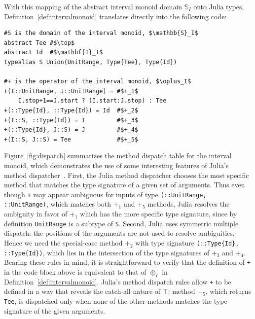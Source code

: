 \documentclass{sig-alternate}
\newcommand{\code}[1]{\texttt{#1}}
\begin{document}
With this mapping of the abstract interval monoid domain $\mathbb S_I$ onto
Julia types, Definition~\ref{def:intervalmonoid} translates directly into the
following code:

\begin{verbatim}
#S is the domain of the interval monoid, $\mathbb{S}_I$
abstract Tee #$\top$
abstract Id  #$\mathbf{1}_I$
typealias S Union(UnitRange, Type{Tee}, Type{Id})

#+ is the operator of the interval monoid, $\oplus_I$
+(I::UnitRange, J::UnitRange) = #$+_1$ 
    I.stop+1==J.start ? (I.start:J.stop) : Tee
+(::Type{Id}, ::Type{Id}) = Id  #$+_2$
+(I::S, ::Type{Id}) = I         #$+_3$
+(::Type{Id}, J::S) = J         #$+_4$
+(I::S, J::S) = Tee             #$+_5$
\end{verbatim}

Figure~\ref{fig:dispatch} summarizes the method dispatch table for the interval
monoid, which demonstrates the use of some interesting features of Julia's
method dispatcher~\cite{Bezanson2012}. First, the Julia method dispatcher
chooses the most specific method that matches the type signature of a given set
of arguments. Thus even though \code{+} may appear ambiguous for inputs of 
type \code{(::Unit\-Range, ::UnitRange)}, which matches both $+_1$ and $+_5$
methods, Julia resolves the ambiguity in favor of $+_1$ which has the more
specific type signature, since by definition \code{UnitRange} is a subtype of
\code{S}. Second, Julia uses symmetric multiple dispatch: the positions of the
arguments are not used to resolve ambiguities. Hence we need the special-case
method $+_2$ with type signature \code{(::Type\{Id\}, ::Type\{Id\})}, which
lies in the intersection of the type signatures of $+_3$ and $+_4$.  Bearing
these rules in mind, it is straightforward to verify that the definition of
\code{+} in the code block above is equivalent to that of $\oplus_I$ in
Definition~\ref{def:intervalmonoid}. Julia's method dispatch rules allow
\code{+} to be defined in a way that reveals the catch-all nature of $\top$:
method $+_5$, which returns \code{Tee}, is dispatched only when none of the
other methods matches the type signature of the given arguments.
\end{document}
